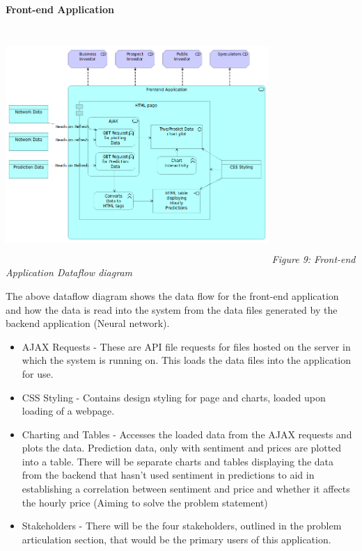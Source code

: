 \documentclass[oneside, 12pt]{article}
\begin{document}
		\textbf{Front-end Application}
		\begin{center}
			\includegraphics[width=10cm,height=9cm]{images/Frontend_Application.png}
			\newline
			\textit{Figure 9: Front-end Application Dataflow diagram}
		\end{center}
		The above dataflow diagram shows the data flow for the front-end application and how the data is read into the system from the data files generated by the backend application (Neural network).
		\begin{itemize}
			\item AJAX Requests - These are API file requests for files hosted on the server in which the system is running on. This loads the data files into the application for use.
			\item CSS Styling - Contains design styling for page and charts, loaded upon loading of a webpage.
			\item Charting and Tables - Accesses the loaded data from the AJAX requests and plots the data. Prediction data, only with sentiment and prices are plotted into a table. There will be separate charts and tables displaying the data from the backend that hasn't used sentiment in predictions to aid in establishing a correlation between sentiment and price and whether it affects the hourly price (Aiming to solve the problem statement)
			\item Stakeholders - There will be the four stakeholders, outlined in the problem articulation section, that would be the primary users of this application.
		\end{itemize}

		
\end{document}
